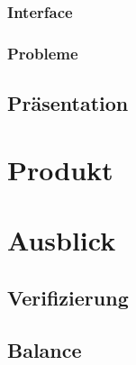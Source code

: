 \documentclass[11pt]{report}
\begin{document}
\section{Interface}
\label{sec:orgba74b21}
\section{Probleme}
\label{sec:org2e8c408}
\chapter{Präsentation}
\label{sec:org8190992}
\part{Produkt}
\label{sec:orgc467e1d}
\part{Ausblick}
\label{sec:orgcd8189e}
\chapter{Verifizierung}
\label{sec:org9e4c3ab}
\chapter{Balance}
\label{sec:org01d33d0}
\end{document}

